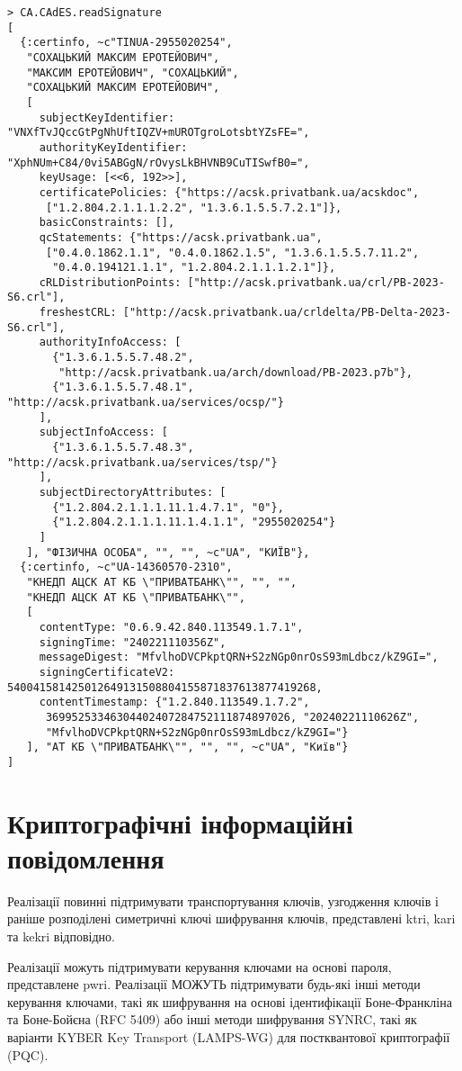 \begin{lstlisting}[utf8]
> CA.CAdES.readSignature
[
  {:certinfo, ~c"TINUA-2955020254",
   "СОХАЦЬКИЙ МАКСИМ ЕРОТЕЙОВИЧ",
   "МАКСИМ ЕРОТЕЙОВИЧ", "СОХАЦЬКИЙ",
   "СОХАЦЬКИЙ МАКСИМ ЕРОТЕЙОВИЧ",
   [
     subjectKeyIdentifier: "VNXfTvJQccGtPgNhUftIQZV+mUROTgroLotsbtYZsFE=",
     authorityKeyIdentifier: "XphNUm+C84/0vi5ABGgN/rOvysLkBHVNB9CuTISwfB0=",
     keyUsage: [<<6, 192>>],
     certificatePolicies: {"https://acsk.privatbank.ua/acskdoc",
      ["1.2.804.2.1.1.1.2.2", "1.3.6.1.5.5.7.2.1"]},
     basicConstraints: [],
     qcStatements: {"https://acsk.privatbank.ua",
      ["0.4.0.1862.1.1", "0.4.0.1862.1.5", "1.3.6.1.5.5.7.11.2",
       "0.4.0.194121.1.1", "1.2.804.2.1.1.1.2.1"]},
     cRLDistributionPoints: ["http://acsk.privatbank.ua/crl/PB-2023-S6.crl"],
     freshestCRL: ["http://acsk.privatbank.ua/crldelta/PB-Delta-2023-S6.crl"],
     authorityInfoAccess: [
       {"1.3.6.1.5.5.7.48.2",
        "http://acsk.privatbank.ua/arch/download/PB-2023.p7b"},
       {"1.3.6.1.5.5.7.48.1", "http://acsk.privatbank.ua/services/ocsp/"}
     ],
     subjectInfoAccess: [
       {"1.3.6.1.5.5.7.48.3", "http://acsk.privatbank.ua/services/tsp/"}
     ],
     subjectDirectoryAttributes: [
       {"1.2.804.2.1.1.1.11.1.4.7.1", "0"},
       {"1.2.804.2.1.1.1.11.1.4.1.1", "2955020254"}
     ]
   ], "ФІЗИЧНА ОСОБА", "", "", ~c"UA", "КИЇВ"},
  {:certinfo, ~c"UA-14360570-2310",
   "КНЕДП АЦСК АТ КБ \"ПРИВАТБАНК\"", "", "",
   "КНЕДП АЦСК АТ КБ \"ПРИВАТБАНК\"",
   [
     contentType: "0.6.9.42.840.113549.1.7.1",
     signingTime: "240221110356Z",
     messageDigest: "MfvlhoDVCPkptQRN+S2zNGp0nrOsS93mLdbcz/kZ9GI=",
     signingCertificateV2: 540041581425012649131508804155871837613877419268,
     contentTimestamp: {"1.2.840.113549.1.7.2",
      36995253346304402407284752111874897026, "20240221110626Z",
      "MfvlhoDVCPkptQRN+S2zNGp0nrOsS93mLdbcz/kZ9GI="}
   ], "АТ КБ \"ПРИВАТБАНК\"", "", "", ~c"UA", "Київ"}
]
\end{lstlisting}
\renewcommand{\footnotesize}{\normal}

\newpage
\section{Криптографічні інформаційні повідомлення}

Реалізації повинні підтримувати транспортування ключів, узгодження ключів
і раніше розподілені симетричні ключі шифрування ключів, представлені ktri,
kari та kekri відповідно.

Реалізації можуть підтримувати керування ключами на основі пароля,
представлене pwri. Реалізації МОЖУТЬ підтримувати будь-які інші методи
керування ключами, такі як шифрування на основі ідентифікації Боне-Франкліна
та Боне-Бойєна (RFC 5409) або інші методи шифрування SYNRC, такі як варіанти
KYBER Key Transport (LAMPS-WG) для постквантової криптографії (PQC).


